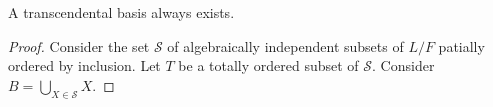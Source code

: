 \begin{lemma}
   A transcendental basis always exists.
\end{lemma}

\begin{proof}
    Consider the set $\mathcal S$ of algebraically independent subsets of $L / F$ patially ordered by inclusion. Let $T$ be a totally ordered subset of $\mathcal S$. Consider $B = \bigcup_{X \in \mathcal S} X$.
\end{proof}
